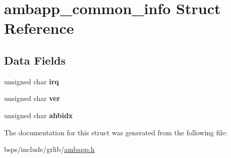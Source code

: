 \hypertarget{structambapp__common__info}{}\section{ambapp\+\_\+common\+\_\+info Struct Reference}
\label{structambapp__common__info}
\subsection*{Data Fields}
\begin{DoxyCompactItemize}
\item 
\mbox{\label{structambapp__common__info_acb4dd1e13fc6f94b5e505a95546e23ce}} 
unsigned char {\bfseries irq}
\item 
\mbox{\label{structambapp__common__info_a1e302e490c32cf5e347ef1e453e39985}} 
unsigned char {\bfseries ver}
\item 
\mbox{\label{structambapp__common__info_ab16bf6d35b104d1621ca422e619b6b84}} 
unsigned char {\bfseries ahbidx}
\end{DoxyCompactItemize}


The documentation for this struct was generated from the following file\+:\begin{DoxyCompactItemize}
\item 
bsps/include/grlib/\mbox{\hyperlink{ambapp_8h}{ambapp.\+h}}\end{DoxyCompactItemize}
